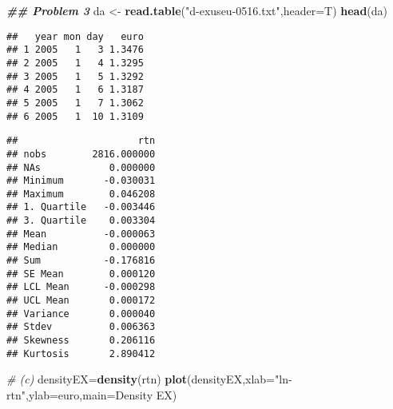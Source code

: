 \documentclass[
]{article}
\newenvironment{Shaded}{\begin{snugshade}}{\end{snugshade}}
\newcommand{\AttributeTok}[1]{\textcolor[rgb]{0.13,0.29,0.53}{#1}}
\newcommand{\CommentTok}[1]{\textcolor[rgb]{0.56,0.35,0.01}{\textit{#1}}}
\newcommand{\DocumentationTok}[1]{\textcolor[rgb]{0.56,0.35,0.01}{\textbf{\textit{#1}}}}
\newcommand{\FunctionTok}[1]{\textcolor[rgb]{0.13,0.29,0.53}{\textbf{#1}}}
\newcommand{\NormalTok}[1]{#1}
\newcommand{\OtherTok}[1]{\textcolor[rgb]{0.56,0.35,0.01}{#1}}
\newcommand{\SpecialCharTok}[1]{\textcolor[rgb]{0.81,0.36,0.00}{\textbf{#1}}}
\newcommand{\StringTok}[1]{\textcolor[rgb]{0.31,0.60,0.02}{#1}}
\begin{document}
\begin{Shaded}
\begin{Highlighting}[]
\DocumentationTok{\#\# Problem 3}
\NormalTok{da }\OtherTok{\textless{}{-}} \FunctionTok{read.table}\NormalTok{(}\StringTok{"d{-}exuseu{-}0516.txt"}\NormalTok{,}\AttributeTok{header=}\NormalTok{T)}
\FunctionTok{head}\NormalTok{(da)}
\end{Highlighting}
\end{Shaded}

\begin{verbatim}
##   year mon day   euro
## 1 2005   1   3 1.3476
## 2 2005   1   4 1.3295
## 3 2005   1   5 1.3292
## 4 2005   1   6 1.3187
## 5 2005   1   7 1.3062
## 6 2005   1  10 1.3109
\end{verbatim}

\begin{Shaded}
\end{Shaded}

\begin{verbatim}
##                     rtn
## nobs        2816.000000
## NAs            0.000000
## Minimum       -0.030031
## Maximum        0.046208
## 1. Quartile   -0.003446
## 3. Quartile    0.003304
## Mean          -0.000063
## Median         0.000000
## Sum           -0.176816
## SE Mean        0.000120
## LCL Mean      -0.000298
## UCL Mean       0.000172
## Variance       0.000040
## Stdev          0.006363
## Skewness       0.206116
## Kurtosis       2.890412
\end{verbatim}

\begin{Shaded}
\begin{Highlighting}[]
\CommentTok{\# (c)}
\NormalTok{densityEX}\OtherTok{=}\FunctionTok{density}\NormalTok{(rtn)}
\FunctionTok{plot}\NormalTok{(densityEX,}\AttributeTok{xlab=}\StringTok{"ln{-}rtn"}\NormalTok{,}\AttributeTok{ylab=}\StringTok{\textquotesingle{}euro\textquotesingle{}}\NormalTok{,}\AttributeTok{main=}\StringTok{\textquotesingle{}Density EX\textquotesingle{}}\NormalTok{)}
\end{Highlighting}
\end{Shaded}
\end{document}
